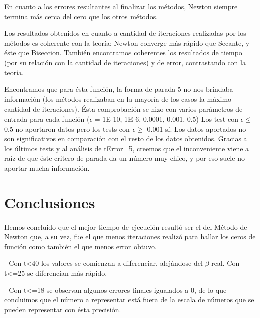 \documentclass[10pt, a4paper]{article}
\begin{document}
En cuanto a los errores resultantes al finalizar los m\'etodos, Newton siempre termina m\'as cerca del cero que los otros m\'etodos.\newline

Los resultados obtenidos en cuanto a cantidad de iteraciones realizadas por los métodos es coherente con la teor\'ia: Newton converge m\'as r\'apido que Secante, y \'este que Biseccion.\newline
Tambi\'en encontramos coherentes los resultados de tiempo (por su relaci\'on con la cantidad de iteraciones) y de error, contrastando con la teor\'ia.\newline

Encontramos que para \'esta funci\'on, la forma de parada 5 no nos brindaba informaci\'on (los m\'etodos realizaban en la mayor\'ia de los casos la m\'aximo cantidad de iteraciones).\newline
\'Esta comprobaci\'on se hizo con varios par\'ametros de entrada para cada funci\'on ($\epsilon$ = 1E-10, 1E-6, 0.0001, 0.001, 0.5)\newline
Los test con $\epsilon \leq$ 0.5 no aportaron datos pero los tests con $\epsilon \geq$ 0.001 s\'i. Los datos aportados no son significativos en comparaci\'on con el resto de los datos obtenidos.\newline
Gracias a los \'ultimos tests y al an\'alisis de tError=5, creemos que el inconveniente viene a ra\'iz de que \'este critero de parada da un n\'umero muy chico, y por eso suele no aportar mucha informaci\'on.\newline


\section{Conclusiones}

Hemos concluido que el mejor tiempo de ejecuci\'on result\'o ser el del M\'etodo de Newton que, a su vez, fue el que menos iteraciones realiz\'o para hallar los ceros de funci\'on como tambi\'en el que menos error obtuvo.\newline

 - Con t<40 los valores se comienzan a diferenciar, alej\'andose del $\beta$ real. Con t<=25 se diferencian m\'as r\'apido.\newline
 
 - Con t<=18 se observan algunos errores finales igualados a 0, de lo que concluimos que el n\'umero a representar está fuera de la escala de n\'umeros que se pueden representar con \'esta precisi\'on.\newline
\end{document}
